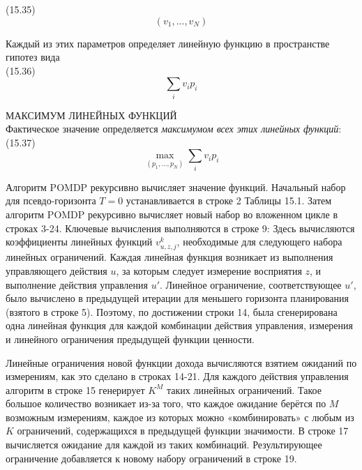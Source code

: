 \documentclass[10pt,a4paper]{article}
\begin{document}
(15.35)
$$(v_1,...,v_N)$$

Каждый из этих параметров определяет линейную функцию в пространстве гипотез вида\\

(15.36)
$$\sum_iv_ip_i$$

МАКСИМУМ ЛИНЕЙНЫХ ФУНКЦИЙ\\

Фактическое значение определяется \textit{максимумом всех этих линейных функций}:\\

(15.37)
$$\underset{(p_1,...,p_N)}{\max}\sum_iv_ip_i$$

Алгоритм POMDP рекурсивно вычисляет значение функций. Начальный набор для псевдо-горизонта $T = 0$ устанавливается в строке 2 Таблицы 15.1. Затем алгоритм POMDP рекурсивно вычисляет новый набор во вложенном цикле в строках 3-24. Ключевые вычисления выполняются в строке 9:  Здесь вычисляются коэффициенты линейных функций $v_{u,z,j}^k$, необходимые для следующего набора линейных ограничений.
Каждая линейная функция возникает из выполнения управляющего действия $u$, за которым следует измерение восприятия $z$, и выполнение действия управления $u'$. Линейное ограничение, соответствующее $u'$, было вычислено в предыдущей итерации для меньшего горизонта планирования (взятого в строке 5). Поэтому, по достижении строки 14, была сгенерирована одна линейная функция для каждой комбинации действия управления, измерения и линейного ограничения предыдущей функции ценности.

Линейные ограничения новой функции дохода вычисляются взятием ожиданий по измерениям, как это сделано в строках 14-21. Для каждого действия управления алгоритм в строке 15 генерирует $K^M$ таких линейных ограничений. Такое большое количество возникает из-за того, что каждое ожидание берётся по $M$ возможным измерениям, каждое из которых можно «комбинировать» с любым из $K$ ограничений, содержащихся в предыдущей функции значимости. В строке 17 вычисляется ожидание для каждой из таких комбинаций. Результирующее ограничение добавляется к новому набору ограничений в строке 19.\\
\end{document}
